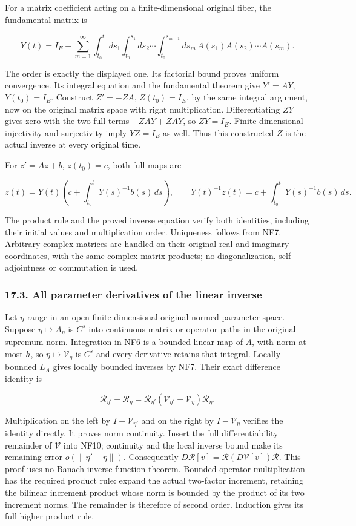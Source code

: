 \documentclass[
  11pt,
]{article}
\begin{document}
For a matrix coefficient acting on a finite-dimensional original fiber,
the fundamental matrix is

\[
 Y(t)=I_E+\sum_{m=1}^{\infty}
   \int_{t_0}^{t}ds_1\int_{t_0}^{s_1}ds_2
       \cdots\int_{t_0}^{s_{m-1}}ds_m\,
        A(s_1)A(s_2)\cdots A(s_m).
 \tag{NF8}
\]

The order is exactly the displayed one. Its factorial bound proves
uniform convergence. Its integral equation and the fundamental theorem
give \(Y'=AY\), \(Y(t_0)=I_E\). Construct \(Z'=-ZA\), \(Z(t_0)=I_E\), by
the same integral argument, now on the original matrix space with right
multiplication. Differentiating \(ZY\) gives zero with the two full
terms \(-ZAY+ZAY\), so \(ZY=I_E\). Finite-dimensional injectivity and
surjectivity imply \(YZ=I_E\) as well. Thus this constructed \(Z\) is
the actual inverse at every original time.

For \(z'=Az+b\), \(z(t_0)=c\), both full maps are

\[
 z(t)=Y(t)\left(c+\int_{t_0}^{t}Y(s)^{-1}b(s)\,ds\right),
 \qquad
 Y(t)^{-1}z(t)=c+\int_{t_0}^{t}Y(s)^{-1}b(s)\,ds .
 \tag{NF9}
\]

The product rule and the proved inverse equation verify both identities,
including their initial values and multiplication order. Uniqueness
follows from NF7. Arbitrary complex matrices are handled on their
original real and imaginary coordinates, with the same complex matrix
products; no diagonalization, self-adjointness or commutation is used.

\subsubsection{17.3. All parameter derivatives of the linear
inverse}\label{all-parameter-derivatives-of-the-linear-inverse}

Let \(\eta\) range in an open finite-dimensional original normed
parameter space. Suppose \(\eta\mapsto A_\eta\) is \(C^s\) into
continuous matrix or operator paths in the original supremum norm.
Integration in NF6 is a bounded linear map of \(A\), with norm at most
\(h\), so \(\eta\mapsto\mathcal V_\eta\) is \(C^s\) and every derivative
retains that integral. Locally bounded \(L_A\) gives locally bounded
inverses by NF7. Their exact difference identity is

\[
 \mathcal R_{\eta'}-\mathcal R_\eta
   =\mathcal R_{\eta'}(\mathcal V_{\eta'}-\mathcal V_\eta)
                         \mathcal R_\eta.
 \tag{NF10}
\]

Multiplication on the left by \(I-\mathcal V_{\eta'}\) and on the right
by \(I-\mathcal V_\eta\) verifies the identity directly. It proves norm
continuity. Insert the full differentiability remainder of
\(\mathcal V\) into NF10; continuity and the local inverse bound make
its remaining error \(o(\|\eta'-\eta\|)\). Consequently
\(D\mathcal R[v]=\mathcal R(D\mathcal V[v])\mathcal R\). This proof uses
no Banach inverse-function theorem. Bounded operator multiplication has
the required product rule: expand the actual two-factor increment,
retaining the bilinear increment product whose norm is bounded by the
product of its two increment norms. The remainder is therefore of second
order. Induction gives its full higher product rule.
\end{document}

